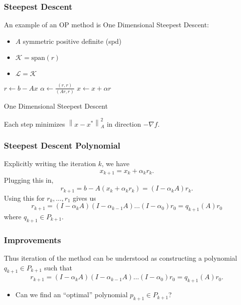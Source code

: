 \documentclass{beamer}
\begin{document}
    \begin{frame}
      \frametitle{Steepest Descent}
      An example of an OP method is One Dimensional Steepest Descent: 
      \begin{itemize}
        \item $A$ symmetric positive definite (spd)
        \item $\mathcal{K} = \text{span}(r)$ 
        \item $\mathcal{L} = \mathcal{K}$
      \end{itemize}
      \begin{algorithm}[H]
        \begin{algorithmic}
          \State $r \gets b - A x$ 
          \State $\alpha \gets \frac{\left( r,r \right)}{\left( Ar,r \right)}$ 
          \State $x \gets x + \alpha r$
          \EndFor
        \end{algorithmic}
        \caption{One Dimensional Steepest Descent}
      \end{algorithm}
      Each step minimizes $\left\| x - x^{*} \right\|_{A}^{2}$ in direction $-\nabla f$.
    \end{frame}

    \begin{frame}
      \frametitle{Steepest Descent Polynomial}
      Explicitly writing the iteration $k$, we have
      \[
      x_{k+1} = x_{k} + \alpha_{k}r_{k}
      .\] 
      Plugging this in,
      \[
      r_{k+1} = b - A\left( x_{k} + \alpha_{k}r_{k} \right) = \left( I - \alpha_{k}A \right)r_{k}
      .\] 
      Using this for $r_{k},\ldots,r_{1}$ gives us
      \[
      r_{k+1} = \left( I - \alpha_{k}A \right)\left( I - \alpha_{k-1}A \right)\ldots \left( I - \alpha_{0} \right)r_{0} = q_{k+1}\left( A \right)r_{0}
      \] 
      where $q_{k+1} \in P_{k+1}$.


    \end{frame}

    \begin{frame}
      \frametitle{Improvements}
      Thus iteration of the method can be understood as constructing a polynomial $q_{k+1} \in P_{k+1}$ such that
      \[
      r_{k+1} = \left( I - \alpha_{k}A \right)\left( I - \alpha_{k-1}A \right)\ldots \left( I - \alpha_{0} \right)r_{0} = q_{k+1}\left( A \right)r_{0}
      .\] 
      \begin{itemize}
        \item Can we find an ``optimal'' polynomial $p_{k+1} \in P_{k+1}$?
      \end{itemize}
    \end{frame}
\end{document}
